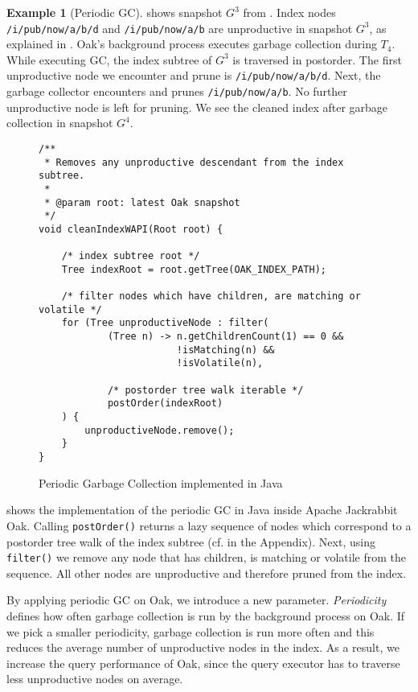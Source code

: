 \documentclass[abstracton,12pt]{scrartcl}
\theoremstyle{definition}
\newtheorem{example}{Example}
\begin{document}
\begin{example}[Periodic GC]
   shows snapshot $G^3$ from
  . Index nodes \texttt{/i/pub/now/a/b/d}
  and \texttt{/i/pub/now/a/b} are unproductive in snapshot $G^3$, as explained
  in . Oak's background process executes garbage
  collection during $T_4$. While executing GC, the index subtree of $G^3$ is
  traversed in postorder.
  The first unproductive node we encounter and prune is
  \texttt{/i/pub/now/a/b/d}. Next, the garbage collector encounters and prunes
  \texttt{/i/pub/now/a/b}. No further unproductive node is left for pruning. We
  see the cleaned index after garbage collection in snapshot $G^4$.
\end{example}

\begin{figure}[H]
  \small
  \begin{framed}
\begin{verbatim}
/**
 * Removes any unproductive descendant from the index subtree.
 *
 * @param root: latest Oak snapshot 
 */
void cleanIndexWAPI(Root root) {

    /* index subtree root */
    Tree indexRoot = root.getTree(OAK_INDEX_PATH);

    /* filter nodes which have children, are matching or volatile */
    for (Tree unproductiveNode : filter(
            (Tree n) -> n.getChildrenCount(1) == 0 &&
                        !isMatching(n) &&
                        !isVolatile(n),

            /* postorder tree walk iterable */
            postOrder(indexRoot)
    ) {
        unproductiveNode.remove();
    }
}
\end{verbatim}
  \end{framed}
  \caption[Periodic GC implemented in Java]{Periodic Garbage Collection
    implemented in Java}
  \label{fig:java_periodic_gc}
\end{figure}

 shows the implementation of the periodic
GC in Java inside Apache Jackrabbit Oak. Calling \texttt{postOrder()} returns a
lazy sequence of nodes
which correspond to a postorder tree walk of the index subtree (cf.
 in the Appendix). Next, using \texttt{filter()} we
remove any node
that has children, is matching or volatile from the sequence. All other nodes are
unproductive and therefore pruned from the index.

By applying periodic GC on Oak, we introduce a new
parameter. \textit{Periodicity} defines how often garbage collection is run by
the background process on Oak. If we pick a smaller
periodicity, garbage collection is run more often and this
reduces the average number of unproductive nodes in the index. As a result, we
increase the query performance of Oak,
since the query executor has to traverse less unproductive nodes on average.
\end{document}

